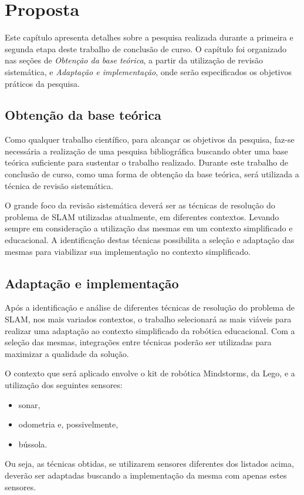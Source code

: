 \chapter[Proposta]{Proposta}

Este capítulo apresenta detalhes sobre a pesquisa realizada durante a primeira e segunda etapa deste trabalho de conclusão de curso. O capítulo foi organizado nas seções de \textit{Obtenção da base teórica}, a partir da utilização de revisão sistemática, e \textit{Adaptação e implementação}, onde serão especificados os objetivos práticos da pesquisa.

\section{Obtenção da base teórica} %
\label{sec:obtenção_da_base_teórica}
	
	Como qualquer trabalho científico, para alcançar os objetivos da pesquisa, faz-se necessária a realização de uma pesquisa bibliográfica buscando obter uma base teórica suficiente para sustentar o trabalho realizado. Durante este trabalho de conclusão de curso, como uma forma de obtenção da base teórica, será utilizada a técnica de revisão sistemática.

	O grande foco da revisão sistemática deverá ser as técnicas de resolução do problema de SLAM utilizadas atualmente, em diferentes contextos. Levando sempre em consideração a utilização das mesmas em um contexto simplificado e educacional. A identificação destas técnicas possibilita a seleção e adaptação das mesmas para viabilizar sua implementação no contexto simplificado.

\section{Adaptação e implementação} %
\label{sec:adaptação_e_implementação}

	Após a identificação e análise de diferentes técnicas de resolução do problema de SLAM, nos mais variados contextos, o trabalho selecionará as mais viáveis para realizar uma adaptação ao contexto simplificado da robótica educacional. 
	Com a seleção das mesmas, integrações entre técnicas poderão ser utilizadas para maximizar a qualidade da solução.

	O contexto que será aplicado envolve o kit de robótica Mindstorms, da Lego, e a utilização dos seguintes sensores:

	\begin{itemize}
		\item sonar,
		\item odometria e, possivelmente,
		\item bússola.
	\end{itemize}

	Ou seja, as técnicas obtidas, se utilizarem sensores diferentes dos listados acima, deverão ser adaptadas buscando a implementação da mesma com apenas estes sensores.
	
